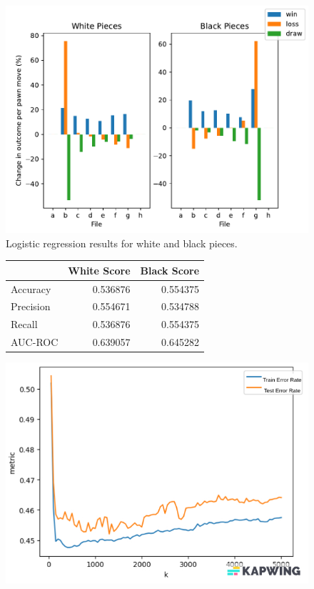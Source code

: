 \documentclass[11pt,a4paper]{article}
\begin{document}
\begin{figure}
  \includegraphics{fig3}
  \caption{Logistic regression results for white and black pieces.}
  \label{}
\end{figure}

\begin{figure}
  \centering
\begin{tabular}{lrr}
  \toprule
  {} &  White Score &  Black Score \\
  \midrule
  Accuracy  &     0.536876 &     0.554375 \\
  Precision &     0.554671 &     0.534788 \\
  Recall    &     0.536876 &     0.554375 \\
  AUC-ROC   &     0.639057 &     0.645282 \\
  \bottomrule
  \end{tabular}
  \caption{}
\end{figure}
\begin{figure}
  \centering
  \includegraphics{fig4}
  \caption{}
\end{figure}
\end{document}
